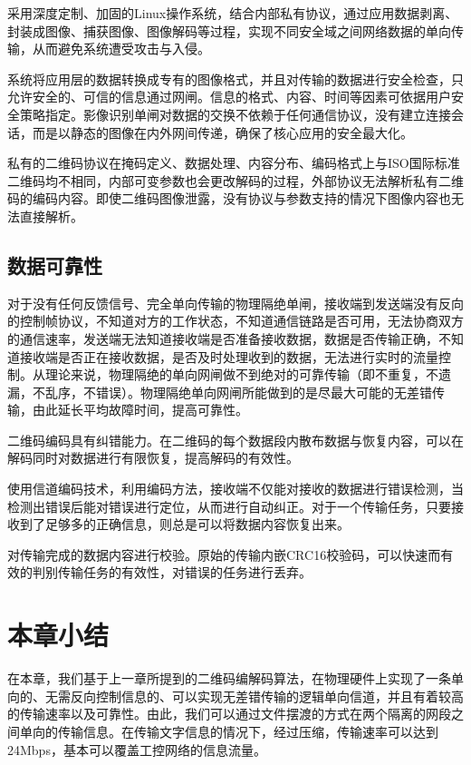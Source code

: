 采用深度定制、加固的Linux操作系统，结合内部私有协议，通过应用数据剥离、封装成图像、捕获图像、图像解码等过程，实现不同安全域之间网络数据的单向传输，从而避免系统遭受攻击与入侵。

系统将应用层的数据转换成专有的图像格式，并且对传输的数据进行安全检查，只允许安全的、可信的信息通过网闸。信息的格式、内容、时间等因素可依据用户安全策略指定。影像识别单闸对数据的交换不依赖于任何通信协议，没有建立连接会话，而是以静态的图像在内外网间传递，确保了核心应用的安全最大化。

私有的二维码协议在掩码定义、数据处理、内容分布、编码格式上与ISO国际标准二维码均不相同，内部可变参数也会更改解码的过程，外部协议无法解析私有二维码的编码内容。即使二维码图像泄露，没有协议与参数支持的情况下图像内容也无法直接解析。

\subsection{数据可靠性}

对于没有任何反馈信号、完全单向传输的物理隔绝单闸，接收端到发送端没有反向的控制帧协议，不知道对方的工作状态，不知道通信链路是否可用，无法协商双方的通信速率，发送端无法知道接收端是否准备接收数据，数据是否传输正确，不知道接收端是否正在接收数据，是否及时处理收到的数据，无法进行实时的流量控制。从理论来说，物理隔绝的单向网闸做不到绝对的可靠传输（即不重复，不遗漏，不乱序，不错误）。物理隔绝单向网闸所能做到的是尽最大可能的无差错传输，由此延长平均故障时间，提高可靠性。

二维码编码具有纠错能力。在二维码的每个数据段内散布数据与恢复内容，可以在解码同时对数据进行有限恢复，提高解码的有效性。

使用信道编码技术，利用编码方法，接收端不仅能对接收的数据进行错误检测，当检测出错误后能对错误进行定位，从而进行自动纠正。对于一个传输任务，只要接收到了足够多的正确信息，则总是可以将数据内容恢复出来\cite{杨云江2004一种在网络通信中自动纠错算法的研究}。

对传输完成的数据内容进行校验。原始的传输内嵌CRC16校验码，可以快速而有效的判别传输任务的有效性，对错误的任务进行丢弃。

\section{本章小结}

在本章，我们基于上一章所提到的二维码编解码算法，在物理硬件上实现了一条单向的、无需反向控制信息的、可以实现无差错传输的逻辑单向信道，并且有着较高的传输速率以及可靠性。由此，我们可以通过文件摆渡的方式在两个隔离的网段之间单向的传输信息。在传输文字信息的情况下，经过压缩，传输速率可以达到24Mbps，基本可以覆盖工控网络的信息流量。